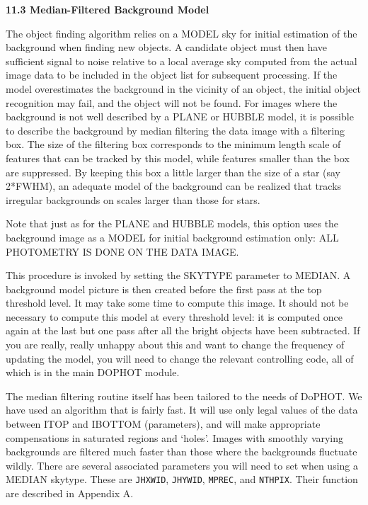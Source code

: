 \centerline {\bf 11.3   Median-Filtered Background Model }
  
The object finding algorithm relies on a MODEL sky for initial 
estimation of the background when finding new objects. A candidate
object must then have sufficient signal to noise relative to a local 
average sky computed from the actual image data to be included in the 
object list for subsequent processing. If the model overestimates the 
background in the vicinity of an object, the initial object recognition
may fail, and the object will not be found. For images where the
background is not well described by a PLANE or HUBBLE model, 
it is possible to describe the background by median filtering the data 
image with a filtering box. The size of the filtering box corresponds
to the minimum length scale of features that can be tracked by this 
model, while features smaller than the box are suppressed. By keeping 
this box a little larger than the size of a star (say 2*FWHM), an 
adequate model of the background can be realized that tracks irregular 
backgrounds on scales larger than those for stars.

Note that just as for the PLANE and HUBBLE models, this option 
uses the background image as a MODEL for initial background estimation 
only:   ALL PHOTOMETRY IS DONE ON THE DATA IMAGE.

This procedure is invoked by setting the SKYTYPE parameter to 
MEDIAN. A background model picture is then created before the first pass
at the top threshold level. It may take some time to compute this image.
It should not be necessary to compute this model at every threshold
level: it is computed once again at the last but one pass after all the
bright objects have been subtracted. If you are really, really unhappy 
about this and want to change the frequency of updating the model, 
you will need to change the relevant controlling code, all of which is 
in the main DOPHOT module.

The median filtering routine itself has been tailored to the needs
of DoPHOT. We have used an algorithm that is fairly fast. It will use 
only legal values of the data between ITOP and IBOTTOM (parameters), and
will make appropriate compensations in saturated regions and `holes'.
Images with smoothly varying backgrounds are 
filtered much faster than those where the backgrounds fluctuate wildly.
There are several associated parameters you will need to set when
using a MEDIAN skytype.  These are {\tt JHXWID}, {\tt JHYWID}, {\tt MPREC},
and {\tt NTHPIX}.  Their function are described in Appendix A.

